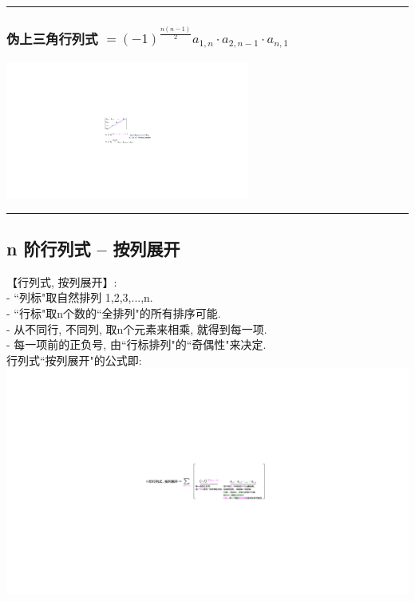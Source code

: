 \documentclass[UTF8]{ctexart}
\begin{document}
\hrule


\subsubsection{伪上三角行列式 $	=\left( -1 \right) ^{\frac{n\left( n-1 \right)}{2}}a_{1,n}\cdot a_{2,n-1}\cdot a_{n,1}	$}

\includegraphics[width=0.6\textwidth]{img/0005.pdf}\\



\hrule


	\subsection{n 阶行列式 -- 按列展开} 
	
	【行列式, 按列展开】:\\
	- ``列标"取自然排列 1,2,3,...,n.  \\
	- ``行标"取n个数的``全排列"的所有排序可能. \\
	- 从不同行, 不同列, 取n个元素来相乘, 就得到每一项. \\
	- 每一项前的正负号, 由``行标排列"的``奇偶性"来决定. \\
	
	行列式``按列展开"的公式即: \\
\includegraphics[width=1\textwidth]{img/0006.pdf}\\
\end{document}
